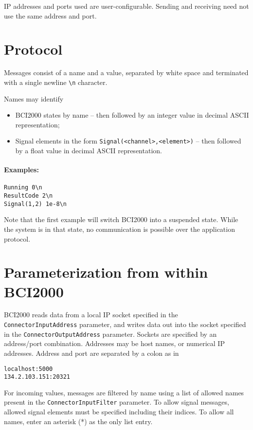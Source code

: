 \documentclass[12pt,a4paper,notitlepage]{article}
\begin{document}
IP addresses and ports used are user-configurable. Sending and receiving need not use the same address and port.


\section{Protocol}

Messages consist of a name and a value, separated by white space
and terminated with a single newline \verb|\n| character.

Names may identify
\begin{itemize}
\item BCI2000 states by name -- then followed
   by an integer value in decimal ASCII representation;
\item Signal elements in the form \texttt{Signal(<channel>,<element>)} --
   then followed by a float value in decimal ASCII representation.
\end{itemize}

\paragraph{Examples:}
\begin{verbatim}
Running 0\n
ResultCode 2\n
Signal(1,2) 1e-8\n
\end{verbatim}

Note that the first example will switch BCI2000 into a suspended state.
While the system is in that state, no communication is possible over the application protocol.

\section{Parameterization from within BCI2000}

BCI2000 reads data from a local IP socket specified in the \texttt{ConnectorInputAddress} parameter, and writes data out into the socket specified in the
\texttt{ConnectorOutputAddress} parameter.
Sockets are specified by an address/port combination.
Addresses may be host names, or numerical IP addresses. Address and port are separated by
a colon as in
\begin{verbatim}
localhost:5000
134.2.103.151:20321
\end{verbatim}

For incoming values, messages are filtered by name using a list of allowed names 
present in the \texttt{ConnectorInputFilter} parameter. 
To allow signal messages, allowed signal elements must be specified including their
indices.
To allow all names, enter an asterisk (*) as the only list entry.
\end{document}
